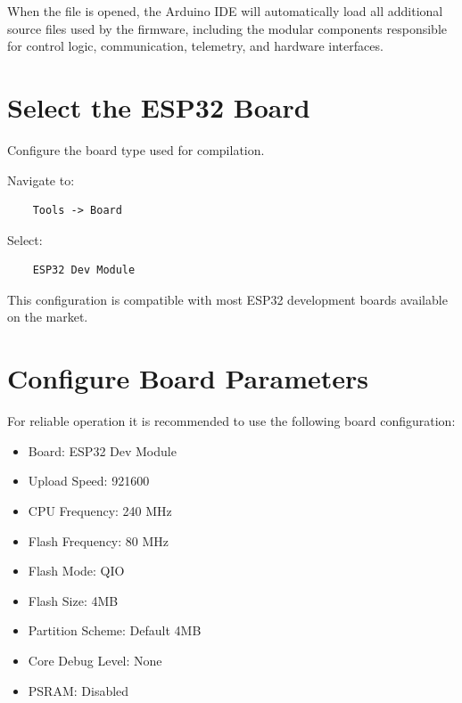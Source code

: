 When the file is opened, the Arduino IDE will automatically load all additional source files used by the firmware, including the modular components responsible for control logic, communication, telemetry, and hardware interfaces.

\section{Select the ESP32 Board}

Configure the board type used for compilation.

Navigate to:

\begin{verbatim}
	Tools -> Board
\end{verbatim}

Select:

\begin{verbatim}
	ESP32 Dev Module
\end{verbatim}

This configuration is compatible with most ESP32 development boards available on the market.

\section{Configure Board Parameters}

For reliable operation it is recommended to use the following board configuration:

\begin{itemize}

	\item Board: ESP32 Dev Module

	\item Upload Speed: 921600

	\item CPU Frequency: 240 MHz

	\item Flash Frequency: 80 MHz

	\item Flash Mode: QIO

	\item Flash Size: 4MB

	\item Partition Scheme: Default 4MB

	\item Core Debug Level: None

	\item PSRAM: Disabled

\end{itemize}

